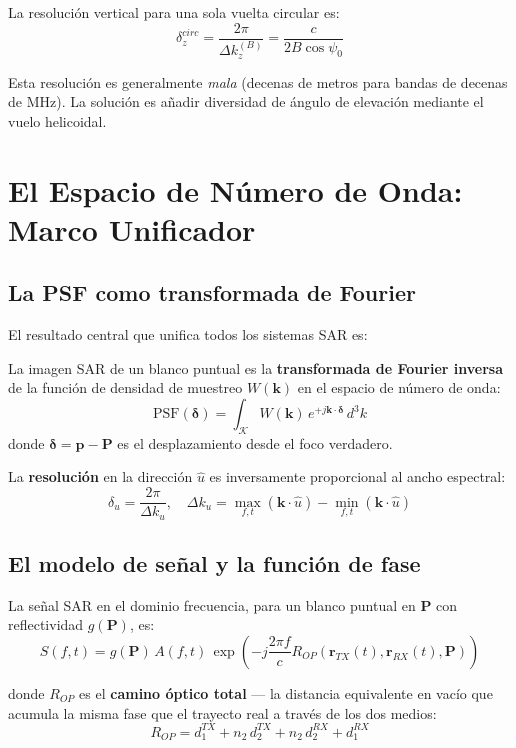 \documentclass[12pt,a4paper,oneside]{book}
\newcommand{\defin}[2]{%
  \begin{tcolorbox}[enhanced, breakable,
    colback=blue!5, colframe=blue!50!black,
    fonttitle=\bfseries,
    title={\protect#1}]
    #2
  \end{tcolorbox}}
\newcommand{\ROP}{R_{\!OP}}
\newcommand{\dz}{\delta_z}
\begin{document}
La resolución vertical para una sola vuelta circular es:
\[
\dz^{circ} = \frac{2\pi}{\Delta k_z^{(B)}} = \frac{c}{2B\cos\psi_0}
\]

Esta resolución es generalmente \emph{mala} (decenas de metros para bandas de decenas de MHz). La solución es añadir diversidad de ángulo de elevación mediante el vuelo helicoidal.

\chapter{El Espacio de Número de Onda: Marco Unificador}

\section{La PSF como transformada de Fourier}

El resultado central que unifica todos los sistemas SAR es:

\defin{Principio de Resolución SAR (dominio k-espacio)}{
La imagen SAR de un blanco puntual es la \textbf{transformada de Fourier inversa} de la función de densidad de muestreo $W(\mathbf{k})$ en el espacio de número de onda:
\[
\mathrm{PSF}(\boldsymbol{\delta}) = \int_{\mathcal{K}} W(\mathbf{k})\,e^{+j\mathbf{k}\cdot\boldsymbol{\delta}}\,d^3k
\]
donde $\boldsymbol{\delta} = \mathbf{p} - \mathbf{P}$ es el desplazamiento desde el foco verdadero.

La \textbf{resolución} en la dirección $\hat{u}$ es inversamente proporcional al ancho espectral:
\[
\delta_u = \frac{2\pi}{\Delta k_u}, \quad \Delta k_u = \max_{f,t}(\mathbf{k}\cdot\hat{u}) - \min_{f,t}(\mathbf{k}\cdot\hat{u})
\]
}

\section{El modelo de señal y la función de fase}

La señal SAR en el dominio frecuencia, para un blanco puntual en $\mathbf{P}$ con reflectividad $g(\mathbf{P})$, es:
\[
S(f, t) = g(\mathbf{P})\,A(f,t)\,\exp\!\left(-j\frac{2\pi f}{c}\ROP(\mathbf{r}_{TX}(t), \mathbf{r}_{RX}(t), \mathbf{P})\right)
\]

donde $\ROP$ es el \textbf{camino óptico total} — la distancia equivalente en vacío que acumula la misma fase que el trayecto real a través de los dos medios:
\[
\ROP = d_1^{TX} + n_2\,d_2^{TX} + n_2\,d_2^{RX} + d_1^{RX}
\]
\end{document}
